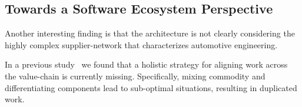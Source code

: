 \subsection{Towards a Software Ecosystem Perspective}\label{sec:subcontractors}

Another interesting finding is that the architecture is not clearly considering the highly complex supplier-network that characterizes automotive engineering. 

%
In a previous study~\cite{Soltani2015,Soltani2015a} 
we found that a holistic strategy for aligning work across the value-chain is currently missing. 
Specifically, mixing commodity and differentiating components lead to sub-optimal situations, resulting in duplicated work.  
